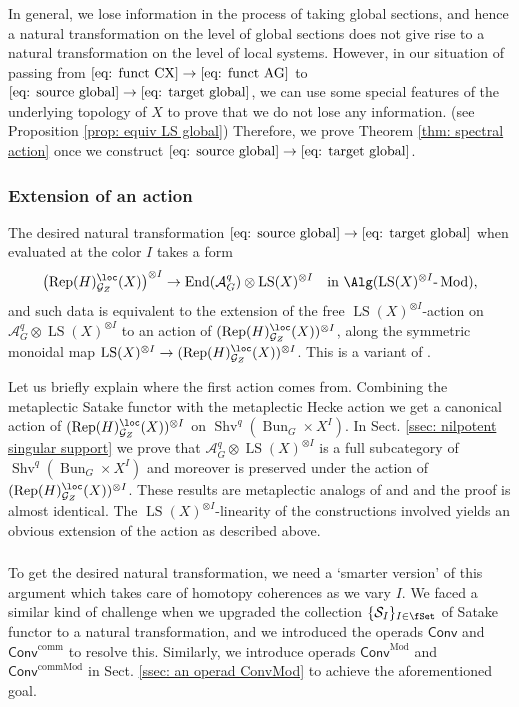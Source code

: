 \documentclass[10pt]{amsart}
\newcommand{\sssec}{\subsubsection}
\theoremstyle{remark}
\newcommand{\te}{\text}
\newcommand{\on}{\operatorname}
\newcommand{\cA}{\mathcal{A}}
\newcommand{\cG}{\mathcal{G}}
\newcommand{\cS}{\mathcal{S}}
\newcommand{\lMod}{\text{-}\on{Mod}}
\newcommand{\Rep}{\on{Rep}}
\newcommand{\Shv}{\on{Shv}}
\newcommand{\LS}{\on{LS}}
\DeclareMathOperator{\End}{End}
\newcommand{\Bun}{\on{Bun}}
\newcommand{\Conv}{\mathsf{Conv}}
\newcommand{\Convcomm}{\mathsf{Conv}^{\on{comm}}}
\newcommand{\ConvMod}{\mathsf{Conv}^{\on{Mod}}}
\newcommand{\ConvcMod}{\mathsf{Conv}^{\on{commMod}}}
\begin{document}
\sssec{}
In general, we lose information in the process of taking global sections, and hence a natural transformation on the level of global sections does not give rise to a natural transformation on the level of local systems. However, in our situation of passing from $\eqref{eq: funct CX}\rightarrow\eqref{eq: funct AG}$ to $\eqref{eq: source global}\rightarrow\eqref{eq: target global}$, we can use some special features of the underlying topology of $X$ to prove that we do not lose any information. (see Proposition \ref{prop: equiv LS global}) Therefore, we prove Theorem \ref{thm: spectral action} once we construct $\eqref{eq: source global}\rightarrow\eqref{eq: target global}$.

\sssec{Extension of an action}
The desired natural transformation $\eqref{eq: source global}\rightarrow \eqref{eq: target global}$ when evaluated at the color $I$ takes a form
\[\left(\Rep(H)^{\loc}_{\cG_Z}(X)\right)^{\otimes I}\rightarrow \End(\cA^q_G)\otimes\LS(X)^{\otimes I}\quad\te{in }\Alg(\LS(X)^{\otimes I}\lMod),\]
and such data is equivalent to the extension of the free $\LS(X)^{\otimes I}$-action on $\cA^q_G\otimes\LS(X)^{\otimes I}$ to an action of $(\Rep(H)^{\loc}_{\cG_Z}(X))^{\otimes I}$, along the symmetric monoidal map $\LS(X)^{\otimes I}\rightarrow (\Rep(H)^{\loc}_{\cG_Z}(X))^{\otimes I}$. This is a variant of \cite[Sect. B.5.5]{GKRV}. 
\medskip

Let us briefly explain where the first action comes from. Combining the metaplectic Satake functor with the metaplectic Hecke action we get a canonical action of $(\Rep(H)^{\loc}_{\cG_Z}(X))^{\otimes I}$ on $\Shv^q(\Bun_G\times X^I)$. In Sect. \ref{ssec: nilpotent singular support} we prove that $\cA^q_G\otimes \LS(X)^{\otimes I}$ is a full subcategory of $\Shv^q(\Bun_G\times X^I)$ and moreover is preserved under the action of $(\Rep(H)^{\loc}_{\cG_Z}(X))^{\otimes I}$. These results are metaplectic analogs of \cite[Theorem 6.1.1]{NY} and \cite[Theorem A.3.9,  B.5.2]{GKRV} and the proof is almost identical. The $\LS(X)^{\otimes I}$-linearity of the constructions involved yields an obvious extension of the action as described above.


\sssec{}
To get the desired natural transformation, we need a `smarter version' of this argument which takes care of homotopy coherences as we vary $I$. We faced a similar kind of challenge when we upgraded the collection $\{\cS_I\}_{I\in\fSet}$ of Satake functor to a natural transformation, and we introduced the operads $\Conv$ and $\Convcomm$ to resolve this. Similarly, we introduce operads $\ConvMod$ and $\ConvcMod$ in Sect. \ref{ssec: an operad ConvMod} to achieve the aforementioned goal.
\medskip
\end{document}
